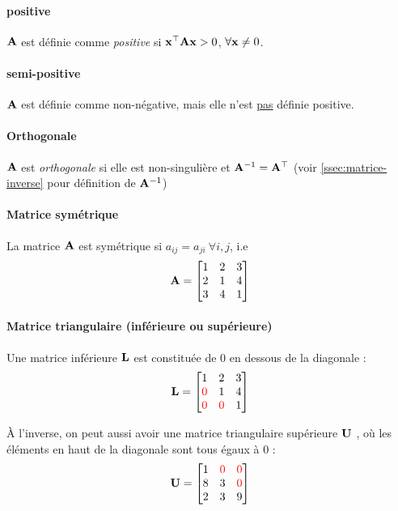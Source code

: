 \paragraph{positive} $\mathbf{A}$ est définie comme \textit{positive} si $\mathbf{x^{\top} A x} > 0$, $\forall \mathbf{x} \neq 0$.

\paragraph{semi-positive} $\mathbf{A}$ est définie comme non-négative, mais elle n'est \underline{pas} définie positive.

\paragraph{Orthogonale} $\mathbf{A}$ est \textit{orthogonale} si elle est non-singulière et $\mathbf{A}^{-1} = \mathbf{A}^{\top}$ (voir \autoref{ssec:matrice-inverse} pour définition de $\mathbf{A}^{-1}$)


\paragraph{Matrice symétrique} La matrice $\mathbf{A}$ est symétrique si  $a_{ij} = a_{ji}  \ \forall i,j$, i.e
\begin{align*}
\mathbf{A} = 
\begin{bmatrix}
1     & 2    &  3   \\
2     & 1   & 4 \\
3   & 4   & 1 \\
\end{bmatrix}
\end{align*}

\paragraph{Matrice triangulaire (inférieure ou supérieure)} Une matrice inférieure $\mathbf{L}$ est constituée de 0 en dessous de la diagonale : 
\begin{align*}
\mathbf{L} = 
\begin{bmatrix}
1     & 2    &  3   \\
\textcolor{red}{0}     & 1   & 4 \\
\textcolor{red}{0}   & \textcolor{red}{0}   & 1 \\
\end{bmatrix}
\end{align*}

À l'inverse, on peut aussi avoir une matrice triangulaire supérieure $\mathbf{U}$ , où les éléments en haut de la diagonale sont tous égaux à 0 : 
\begin{align*}
\mathbf{U} = 
\begin{bmatrix}
1     & \textcolor{red}{0}    &  \textcolor{red}{0}   \\
8     & 3   & \textcolor{red}{0} \\
2   & 3   & 9 \\
\end{bmatrix}
\end{align*}


